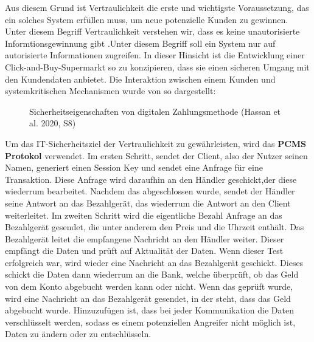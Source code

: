 Aus diesem Grund ist Vertraulichkeit die erste und wichtigste Voraussetzung, das ein solches System 
erfüllen muss, um neue potenzielle Kunden zu gewinnen. Unter diesem Begriff Vertraulichkeit verstehen wir, 
dass es keine unautorisierte Informtionsgewinnung gibt \cite{refbook:SWIS} .Unter diesem Begriff soll
ein System nur auf autorisierte Informationen zugreifen. In dieser Hinsicht ist die Entwicklung 
einer Click-and-Buy-Supermarkt so zu konzipieren, dass sie einen sicheren Umgang mit den Kundendaten
anbietet. Die Interaktion zwischen einem Kunden und systemkritischen Mechanismen wurde von
\cite{refart:HARE} so dargestellt:

\vfill
\begin{figure}[htb]
    \caption{Sicherheitseigenschaften von digitalen Zahlungsmethode (Hassan et al. 2020, S8)}
    \label{fig:refark_HARE}
\end{figure}
\vfill


Um das IT-Sicherheitsziel der Vertraulichkeit zu gewährleisten, wird das \textbf{PCMS Protokol} verwendet. 
Im ersten Schritt, sendet der Client, also der Nutzer seinen Namen, generiert einen Session Key 
und sendet eine Anfrage für eine Transaktion\cite{refart:JTAS}. Diese Anfrage wird daraufhin an den Händler 
geschickt,der diese wiederrum bearbeitet. Nachdem das abgeschlossen wurde, sendet der Händler seine Antwort
an das Bezahlgerät, das wiederrum die Antwort an den Client weiterleitet. Im zweiten Schritt wird
die eigentliche Bezahl Anfrage an das Bezahlgerät gesendet, die unter anderem den Preis und die 
Uhrzeit enthält. Das Bezahlgerät leitet die empfangene Nachricht an den Händler weiter. 
Dieser empfängt die Daten und prüft auf Aktualität der Daten. Wenn dieser Test erfolgreich war, 
wird wieder eine Nachricht an das Bezahlgerät geschickt. Dieses schickt die Daten dann wiederrum 
an die Bank, welche überprüft, ob das Geld von dem Konto abgebucht werden kann oder nicht.
Wenn das geprüft wurde, wird eine Nachricht an das Bezahlgerät gesendet, in der steht, dass das
Geld abgebucht wurde. Hinzuzufügen ist, dass bei jeder Kommunikation die Daten verschlüsselt werden, 
sodass es einem potenziellen Angreifer nicht möglich ist, Daten zu ändern oder zu entschlüsseln.


